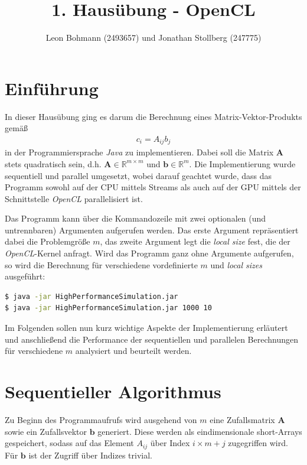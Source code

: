 \documentclass[
	ngerman,
	ruledheaders=section,
	class=report,
	thesis={type=Dokumentation},
	ignore-missing-data=true,
	accentcolor=9c,
	custommargins=false,
	marginpar=false,
	parskip=half-,
	fontsize=11pt,
]{tudapub}
\begin{document}

\title{1. Hausübung - OpenCL}
\author[]{Leon Bohmann (2493657) und Jonathan Stollberg (247775)}
\submissiondate{\today}

\maketitle
\tableofcontents

\chapter{Einführung}
In dieser Hausübung ging es darum die Berechnung eines Matrix-Vektor-Produkts gemäß
\begin{align*}
	c_{i} = A_{ij}b_{j}
\end{align*}
in der Programmiersprache \textit{Java} zu implementieren. Dabei soll die Matrix $\mathbf{A}$ stets quadratisch sein, d.h. $\mathbf{A} \in \mathbb{R}^{m\times m}$ und $\mathbf{b} \in \mathbb{R}^{m}$. Die Implementierung wurde sequentiell und parallel umgesetzt, wobei darauf geachtet wurde, dass das Programm sowohl auf der CPU mittels Streams als auch auf der GPU mittels der Schnittstelle \textit{OpenCL} parallelisiert ist.

Das Programm kann über die Kommandozeile mit zwei optionalen (und untrennbaren) Argumenten aufgerufen werden. Das erste Argument repräsentiert dabei die Problemgröße $m$, das zweite Argument legt die \textit{local size} fest, die der \textit{OpenCL}-Kernel anfragt. Wird das Programm ganz ohne Argumente aufgerufen, so wird die Berechnung für verschiedene vordefinierte $m$ und \textit{local sizes} ausgeführt:
\begin{lstlisting}[language=bash]
$ java -jar HighPerformanceSimulation.jar
$ java -jar HighPerformanceSimulation.jar 1000 10
\end{lstlisting}

Im Folgenden sollen nun kurz wichtige Aspekte der Implementierung erläutert und anschließend die Performance der sequentiellen und parallelen Berechnungen für verschiedene $m$ analysiert und beurteilt werden.

\chapter{Sequentieller Algorithmus}
Zu Beginn des Programmaufrufs wird ausgehend von $m$ eine Zufallsmatrix $\mathbf{A}$ sowie ein Zufallsvektor $\mathbf{b}$ generiert. Diese werden als eindimensionale short-Arrays gespeichert, sodass auf das Element $A_{ij}$ über Index $i\times m + j$ zugegriffen wird. Für $\mathbf{b}$ ist der Zugriff über Indizes trivial.
\end{document}
